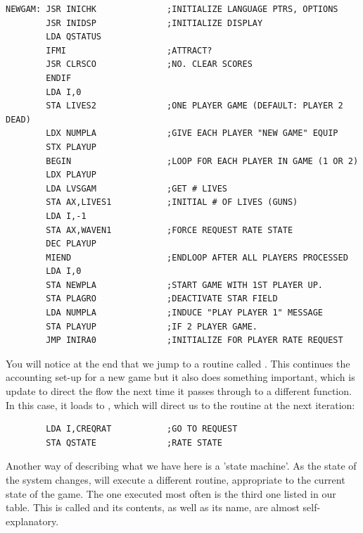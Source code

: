 \begin{lstlisting}
NEWGAM: JSR INICHK              ;INITIALIZE LANGUAGE PTRS, OPTIONS
        JSR INIDSP              ;INITIALIZE DISPLAY
        LDA QSTATUS
        IFMI                    ;ATTRACT?
        JSR CLRSCO              ;NO. CLEAR SCORES
        ENDIF
        LDA I,0
        STA LIVES2              ;ONE PLAYER GAME (DEFAULT: PLAYER 2 DEAD)
        LDX NUMPLA              ;GIVE EACH PLAYER "NEW GAME" EQUIP
        STX PLAYUP
        BEGIN                   ;LOOP FOR EACH PLAYER IN GAME (1 OR 2)
        LDX PLAYUP
        LDA LVSGAM              ;GET # LIVES
        STA AX,LIVES1           ;INITIAL # OF LIVES (GUNS)
        LDA I,-1
        STA AX,WAVEN1           ;FORCE REQUEST RATE STATE
        DEC PLAYUP
        MIEND                   ;ENDLOOP AFTER ALL PLAYERS PROCESSED
        LDA I,0
        STA NEWPLA              ;START GAME WITH 1ST PLAYER UP.
        STA PLAGRO              ;DEACTIVATE STAR FIELD
        LDA NUMPLA              ;INDUCE "PLAY PLAYER 1" MESSAGE
        STA PLAYUP              ;IF 2 PLAYER GAME.
        JMP INIRA0              ;INITIALIZE FOR PLAYER RATE REQUEST
\end{lstlisting}

You will notice at the end that we jump to a routine called . This continues the accounting set-up for a new
game but it also does something important, which is update  to direct the flow the next time it passes through
 to a different function. In this case, it loads  to , which will direct us to the routine
 at the next iteration:
\begin{lstlisting}
        LDA I,CREQRAT           ;GO TO REQUEST
        STA QSTATE              ;RATE STATE
\end{lstlisting}

Another way of describing what we have here is a 'state machine'. As the state of the system changes,  will execute
a different routine, appropriate to the current state of the game. The one executed most often is the third one listed in our
 table. This is called  and its contents, as well as its name, are almost self-explanatory.

